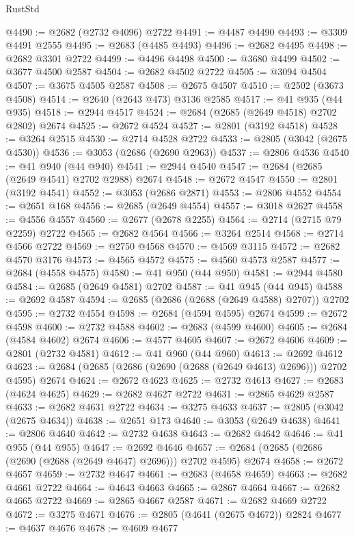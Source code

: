 \begin{lexlean}{RustStd}
\begin{coremodule}
{\begin{coremodule}
{{{{{{{{{{{{{{{{{{{{{{{{{{@4490 := @2682 (@2732 @4096) @2722
@4491 := @4487 @4490
@4493 := @3309 @4491 @2555
@4495 := @2683 (@4485 @4493)
@4496 := @2682 @4495
@4498 := @2682 @3301 @2722
@4499 := @4496 @4498
@4500 := @3680 @4499
@4502 := @3677 @4500 @2587
@4504 := @2682 @4502 @2722
@4505 := @3094 @4504
@4507 := @3675 @4505 @2587
@4508 := @2675 @4507
@4510 := @2502 (@3673 @4508)
@4514 := @2640 (@2643 @473) @3136 @2585
@4517 := @41 @935 (@44 @935)
@4518 := @2944 @4517
@4524 := @2684 (@2685 (@2649 @4518) @2702 @2802) @2674
@4525 := @2672 @4524
@4527 := @2801 (@3192 @4518)
@4528 := @3264 @2515
@4530 := @2714 @4528 @2722
@4533 := @2805 (@3042 (@2675 @4530))
@4536 := @3053 (@2686 (@2690 @2963))
@4537 := @2806 @4536
@4540 := @41 @940 (@44 @940)
@4541 := @2944 @4540
@4547 := @2684 (@2685 (@2649 @4541) @2702 @2988) @2674
@4548 := @2672 @4547
@4550 := @2801 (@3192 @4541)
@4552 := @3053 (@2686 @2871)
@4553 := @2806 @4552
@4554 := @2651 @168
@4556 := @2685 (@2649 @4554)
@4557 := @3018 @2627
@4558 := @4556 @4557
@4560 := @2677 (@2678 @2255)
@4564 := @2714 (@2715 @79 @2259) @2722
@4565 := @2682 @4564
@4566 := @3264 @2514
@4568 := @2714 @4566 @2722
@4569 := @2750 @4568
@4570 := @4569 @3115
@4572 := @2682 @4570 @3176
@4573 := @4565 @4572
@4575 := @4560 @4573 @2587
@4577 := @2684 (@4558 @4575)
@4580 := @41 @950 (@44 @950)
@4581 := @2944 @4580
@4584 := @2685 (@2649 @4581) @2702
@4587 := @41 @945 (@44 @945)
@4588 := @2692 @4587
@4594 := @2685 (@2686 (@2688 (@2649 @4588) @2707)) @2702
@4595 := @2732 @4554
@4598 := @2684 (@4594 @4595) @2674
@4599 := @2672 @4598
@4600 := @2732 @4588
@4602 := @2683 (@4599 @4600)
@4605 := @2684 (@4584 @4602) @2674
@4606 := @4577 @4605
@4607 := @2672 @4606
@4609 := @2801 (@2732 @4581)
@4612 := @41 @960 (@44 @960)
@4613 := @2692 @4612
@4623 := @2684 (@2685 (@2686 (@2690 (@2688 (@2649 @4613) @2696))) @2702 @4595) @2674
@4624 := @2672 @4623
@4625 := @2732 @4613
@4627 := @2683 (@4624 @4625)
@4629 := @2682 @4627 @2722
@4631 := @2865 @4629 @2587
@4633 := @2682 @4631 @2722
@4634 := @3275 @4633
@4637 := @2805 (@3042 (@2675 @4634))
@4638 := @2651 @173
@4640 := @3053 (@2649 @4638)
@4641 := @2806 @4640
@4642 := @2732 @4638
@4643 := @2682 @4642
@4646 := @41 @955 (@44 @955)
@4647 := @2692 @4646
@4657 := @2684 (@2685 (@2686 (@2690 (@2688 (@2649 @4647) @2696))) @2702 @4595) @2674
@4658 := @2672 @4657
@4659 := @2732 @4647
@4661 := @2683 (@4658 @4659)
@4663 := @2682 @4661 @2722
@4664 := @4643 @4663
@4665 := @2867 @4664
@4667 := @2682 @4665 @2722
@4669 := @2865 @4667 @2587
@4671 := @2682 @4669 @2722
@4672 := @3275 @4671
@4676 := @2805 (@4641 (@2675 @4672)) @2824
@4677 := @4637 @4676
@4678 := @4609 @4677
}}}}}}}}}}}}}}}}}}}}}}}}}}
\end{coremodule}}
\end{coremodule}
\end{lexlean}
